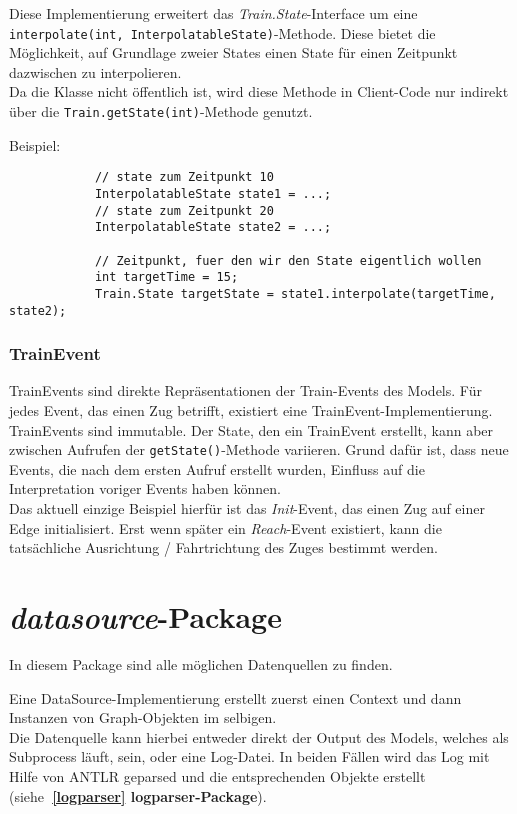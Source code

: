 \documentclass[accentcolor=tud0b,12pt,paper=a4]{tudreport}
\begin{document}
			Diese Implementierung erweitert das \textit{Train.State}-Interface um eine\\
			\texttt{interpolate(int, InterpolatableState)}-Methode. Diese bietet die Möglichkeit, auf Grundlage zweier States einen State für einen Zeitpunkt dazwischen zu interpolieren.\\
			Da die Klasse nicht öffentlich ist, wird diese Methode in Client-Code nur indirekt über die \texttt{Train.getState(int)}-Methode genutzt.
			
			Beispiel:\\
			\begin{lstlisting}
			// state zum Zeitpunkt 10
			InterpolatableState state1 = ...;
			// state zum Zeitpunkt 20
			InterpolatableState state2 = ...;
			
			// Zeitpunkt, fuer den wir den State eigentlich wollen
			int targetTime = 15;
			Train.State targetState = state1.interpolate(targetTime, state2);
			\end{lstlisting}
			
		
		\subsection{TrainEvent}
		\label{trainevent}
			TrainEvents sind direkte Repräsentationen der Train-Events des Models. Für jedes Event, das einen Zug betrifft, existiert eine TrainEvent-Implementierung.
			TrainEvents sind immutable. Der State, den ein TrainEvent erstellt, kann aber zwischen Aufrufen der \texttt{getState()}-Methode variieren. Grund dafür ist, dass neue Events, die nach dem ersten Aufruf erstellt wurden, Einfluss auf die Interpretation voriger Events haben können.\\
			Das aktuell einzige Beispiel hierfür ist das \textit{Init}-Event, das einen Zug auf einer Edge initialisiert. Erst wenn später ein \textit{Reach}-Event existiert, kann die tatsächliche Ausrichtung / Fahrtrichtung des Zuges bestimmt werden.
		
		
	\chapter{\textit{datasource}-Package}
	In diesem Package sind alle möglichen Datenquellen zu finden.
	
	Eine DataSource-Implementierung erstellt zuerst einen Context und dann Instanzen von Graph-Objekten im selbigen.\\
	Die Datenquelle kann hierbei entweder direkt der Output des Models, welches als Subprocess läuft, sein, oder eine Log-Datei.
	In beiden Fällen wird das Log mit Hilfe von ANTLR geparsed und die entsprechenden Objekte erstellt (siehe\textbf{~\ref{logparser} logparser-Package}).
	
\end{document}
